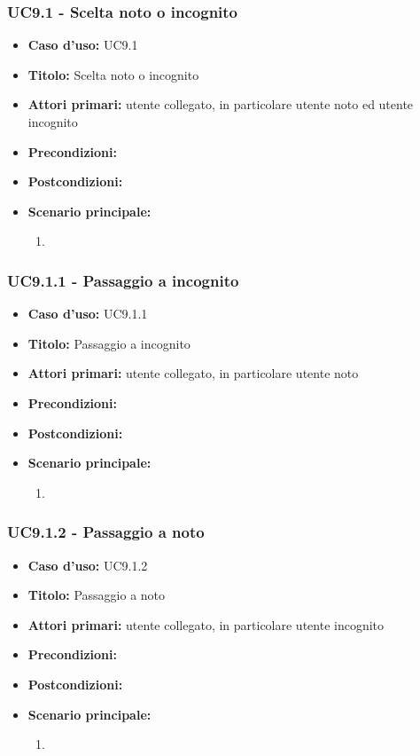 \documentclass[casi-duso]{subfiles}
\begin{document}
\subsubsection{UC9.1 - Scelta noto o incognito}
\label{subsub:uc9.1utente}
\begin{itemize}
  \item \textbf{Caso d’uso:} UC9.1
  \item \textbf{Titolo:} Scelta noto o incognito
  \item \textbf{Attori primari:} utente collegato, in particolare utente noto ed utente incognito
  \item \textbf{Precondizioni:} 
  \item \textbf{Postcondizioni:}
  \item \textbf{Scenario principale:} 
  \begin{enumerate}
    \item 
  \end{enumerate}
\end{itemize}

\subsubsection{UC9.1.1 - Passaggio a incognito}
\label{subsub:uc9.1.1utente}
\begin{itemize}
  \item \textbf{Caso d’uso:} UC9.1.1
  \item \textbf{Titolo:} Passaggio a incognito
  \item \textbf{Attori primari:} utente collegato, in particolare utente noto
  \item \textbf{Precondizioni:} 
  \item \textbf{Postcondizioni:}
  \item \textbf{Scenario principale:} 
  \begin{enumerate}
    \item 
  \end{enumerate}
\end{itemize}

\subsubsection{UC9.1.2 - Passaggio a noto}
\label{subsub:uc9.1.2utente}
\begin{itemize}
  \item \textbf{Caso d’uso:} UC9.1.2
  \item \textbf{Titolo:} Passaggio a noto
  \item \textbf{Attori primari:} utente collegato, in particolare utente incognito
  \item \textbf{Precondizioni:} 
  \item \textbf{Postcondizioni:}
  \item \textbf{Scenario principale:} 
  \begin{enumerate}
    \item 
  \end{enumerate}
\end{itemize}
\end{document}
